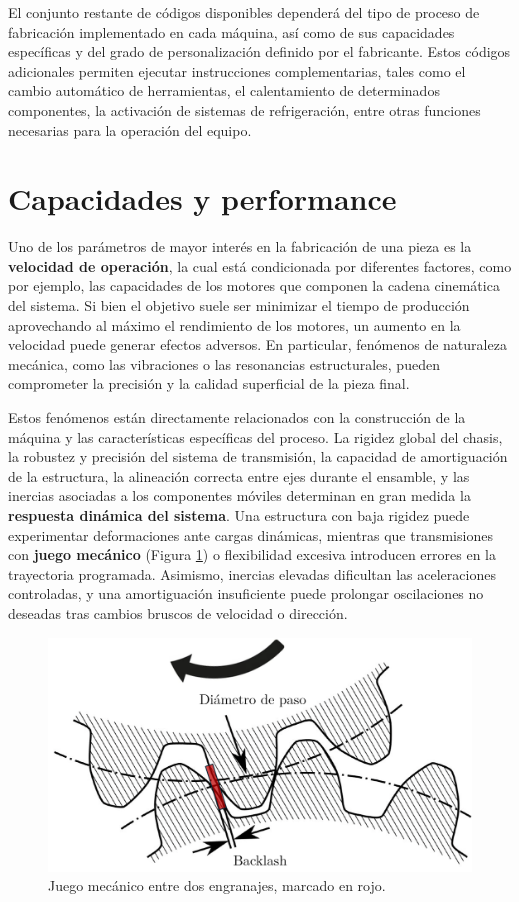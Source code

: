 El conjunto restante de códigos disponibles dependerá del tipo de proceso de fabricación implementado en cada máquina, así como de sus capacidades específicas y del grado de personalización definido por el fabricante. Estos códigos adicionales permiten ejecutar instrucciones complementarias, tales como el cambio automático de herramientas, el calentamiento de determinados componentes, la activación de sistemas de refrigeración, entre otras funciones necesarias para la operación del equipo.

\section{Capacidades y performance}

Uno de los parámetros de mayor interés en la fabricación de una pieza es la \textbf{velocidad de operación}, la cual está condicionada por diferentes factores, como por ejemplo, las capacidades de los motores que componen la cadena cinemática del sistema. Si bien el objetivo suele ser minimizar el tiempo de producción aprovechando al máximo el rendimiento de los motores, un aumento en la velocidad puede generar efectos adversos. En particular, fenómenos de naturaleza mecánica, como las vibraciones o las resonancias estructurales, pueden comprometer la precisión y la calidad superficial de la pieza final.

Estos fenómenos están directamente relacionados con la construcción de la máquina y las características específicas del proceso. La rigidez global del chasis, la robustez y precisión del sistema de transmisión, la capacidad de amortiguación de la estructura, la alineación correcta entre ejes durante el ensamble, y las inercias asociadas a los componentes móviles determinan en gran medida la \textbf{respuesta dinámica del sistema}. Una estructura con baja rigidez puede experimentar deformaciones ante cargas dinámicas, mientras que transmisiones con \textbf{juego mecánico} (Figura \ref{gears}) o flexibilidad excesiva introducen errores en la trayectoria programada. Asimismo, inercias elevadas dificultan las aceleraciones controladas, y una amortiguación insuficiente puede prolongar oscilaciones no deseadas tras cambios bruscos de velocidad o dirección.


\begin{figure}[h!]
    \centering
    \includegraphics[width=0.7\linewidth]{imgs/gears.png}
    \caption{Juego mecánico entre dos engranajes, marcado en rojo.}
    \label{gears}
\end{figure}

